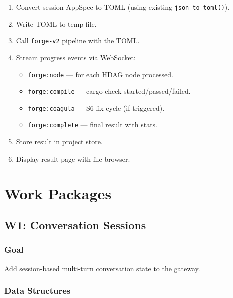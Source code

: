\documentclass[11pt,a4paper]{article}
\begin{document}
\begin{enumerate}[nosep]
\item Convert session AppSpec to TOML (using existing 
      \texttt{json\_to\_toml()}).
\item Write TOML to temp file.
\item Call \texttt{forge-v2} pipeline with the TOML.
\item Stream progress events via WebSocket:
      \begin{itemize}[nosep]
      \item \texttt{forge:node} --- for each HDAG node processed.
      \item \texttt{forge:compile} --- cargo check started/passed/failed.
      \item \texttt{forge:coagula} --- S6 fix cycle (if triggered).
      \item \texttt{forge:complete} --- final result with stats.
      \end{itemize}
\item Store result in project store.
\item Display result page with file browser.
\end{enumerate}


\section{Work Packages}

\subsection{W1: Conversation Sessions}
\label{sec:w1}

\subsubsection{Goal}

Add session-based multi-turn conversation state to the gateway.

\subsubsection{Data Structures}
\end{document}
